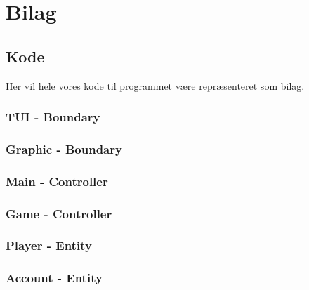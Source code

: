 \documentclass{article}
\begin{document}
\section{Bilag}
\subsection{Kode}
Her vil hele vores kode til programmet være repræsenteret som bilag.
\subsubsection{TUI - Boundary}

\subsubsection{Graphic - Boundary}

\subsubsection{Main - Controller}

\subsubsection{Game - Controller}

\subsubsection{Player - Entity}

\subsubsection{Account - Entity}

\end{document}
